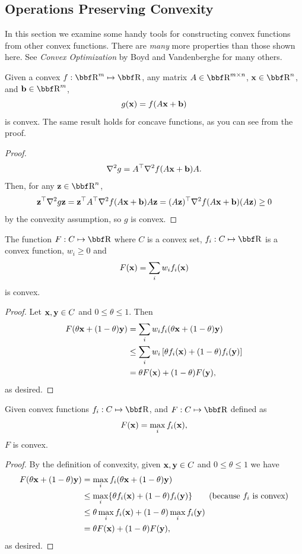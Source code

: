 \documentclass{article}
\begin{document}
\subsection{Operations Preserving Convexity}

In this section we examine some handy tools for constructing
convex functions from other convex functions. There are \textit{many}
more properties than those shown here. See \textit{Convex Optimization}
by Boyd and Vandenberghe for many others.

\begin{theorem}
    Given a convex $f : \RR^m \mapsto \RR$, any matrix $A\in\RR^{m \times n}$, $\xx\in\RR^n$,
    and $\bb\in\RR^m$,
    \[
        g({\bf x}) = f(A{\bf x} + {\bf b})
    \]
    is convex. The same result holds for concave functions, as you can see
    from the proof.
\end{theorem}
\begin{proof}
    \[
        \nabla^2g = A^\top \nabla^2 f(A{\bf x} + {\bf b}) A.
    \]
    Then, for any $\zz\in\RR^n$,
    \[
        {\bf z}^\top \nabla^2g {\bf z} = {\bf z}^\top A^\top \nabla^2 f(A{\bf x} + {\bf b}) A {\bf z} = (A{\bf z})^\top\nabla^2 f(A{\bf x} + {\bf b}) (A {\bf z}) \geq 0
    \]
    by the convexity assumption, so $g$ is convex.
\end{proof}

\begin{theorem}
    The function $F : C \mapsto \RR$ where $C$ is a convex set, $f_i : C\mapsto\RR$ is a convex
    function, $w_i \geq 0$ and
    \[
        F({\bf x}) = \sum_i w_i f_i({\bf x})
    \]
    is convex.
\end{theorem}
\begin{proof}
    Let ${\bf x},{\bf y}\in C$ and $0\leq\theta\leq1$. Then
    \begin{align*}
        F(\theta{\bf x} + (1-\theta){\bf y}) &= \sum_i w_if_i(\theta{\bf x} + (1-\theta){\bf y})\\
        &\leq \sum_i w_i\left[ \theta f_i({\bf x}) + (1-\theta)f_i({\bf y}) \right]\\
        &= \theta F({\bf x}) + (1-\theta)F({\bf y}),
    \end{align*}
    as desired.
\end{proof}

\begin{theorem}
    Given convex functions $f_i : C \mapsto \RR$, and $F : C \mapsto \RR$ defined
    as
    \[
        F({\bf x}) = \max_i f_i({\bf x}),
    \]
    $F$ is convex.
\end{theorem}
\begin{proof}
    By the definition of convexity, given ${\bf x},{\bf y}\in C$ and $0\leq\theta\leq1$ we
    have
    \begin{align*}
        F(\theta{\bf x} + (1-\theta){\bf y}) &= \max_i f_i(\theta{\bf x} + (1-\theta){\bf y})\\
        &\leq \max_i\{\theta f_i({\bf x}) + (1-\theta)f_i({\bf y})\} \tag{because $f_i$ is convex}\\
        &\leq \theta \max_i f_i({\bf x}) + (1-\theta)\max_i f_i({\bf y})\\
        &= \theta F({\bf x}) + (1-\theta) F({\bf y}),
    \end{align*}
    as desired.
\end{proof}
\end{document}
